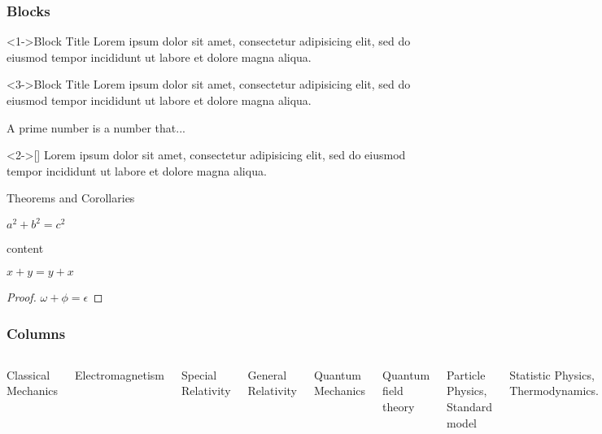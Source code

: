\documentclass{beamer}
\begin{document}
\begin{frame}
	\frametitle{Blocks}
	\begin{block}<1->{Block Title}
		Lorem ipsum dolor sit amet, consectetur adipisicing elit,
		sed do eiusmod tempor incididunt ut labore et
		dolore magna aliqua.
	\end{block}
	\begin{alertblock}<3->{Block Title}
		Lorem ipsum dolor sit amet, consectetur adipisicing elit,
		sed do eiusmod tempor incididunt ut labore et
		dolore magna aliqua.
	\end{alertblock}
	\begin{definition}
		A prime number is a number that...
	\end{definition}
	\begin{example}<2->[\citealp{Bowen1975}]
		Lorem ipsum dolor sit amet, consectetur adipisicing elit,
		sed do eiusmod tempor incididunt ut labore et
		dolore magna aliqua.
	\end{example}
\end{frame}


\begin{frame}{Theorems and Corollaries}

	\begin{theorem}[Pythagoras]
		$ a^2 + b^2 = c^2$
	\end{theorem}

	\begin{theorem}
		content
	\end{theorem}

	\begin{corollary}
		$ x + y = y + x  $
	\end{corollary}
	\begin{proof}
		$\omega +\phi = \epsilon $
	\end{proof}
\end{frame}


\begin{frame}
	\frametitle{Columns}
	\begin{columns}
		Classical Mechanics
		
		Electromagnetism
		
		Special Relativity
		
		General Relativity
		
		Quantum Mechanics
		
		Quantum field theory
		
		Particle Physics, Standard model
		
		Statistic Physics, Thermodynamics.


	\end{columns}

\end{frame}
\end{document}
